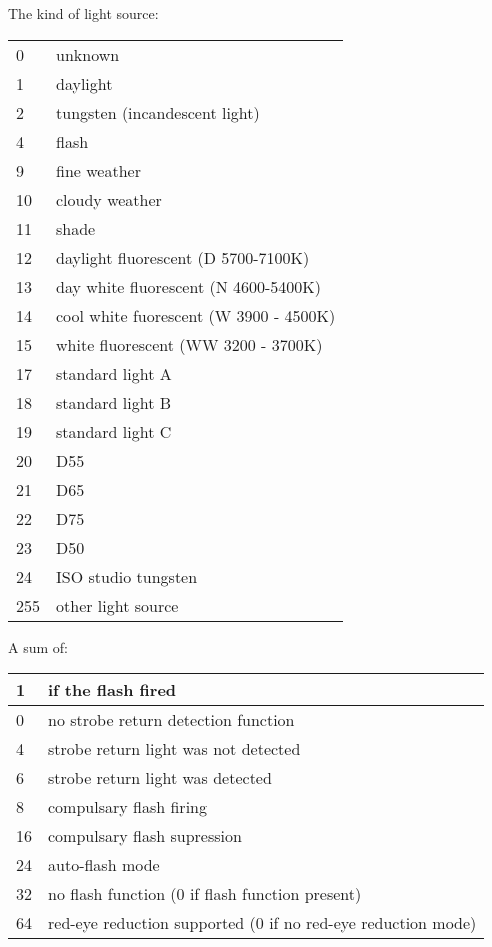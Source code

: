 The kind of light source:

\medskip

\begin{tabular}{p{0.3in} p{4in}}
0 & unknown \\
1 & daylight \\
2 & tungsten (incandescent light) \\
4 & flash \\
9 & fine weather \\
10 & cloudy weather \\
11 & shade \\
12 & daylight fluorescent (D 5700-7100K) \\
13 & day white fluorescent (N 4600-5400K) \\
14 & cool white fuorescent (W 3900 - 4500K) \\
15 & white fluorescent (WW 3200 - 3700K) \\
17 & standard light A \\
18 & standard light B \\
19 & standard light C \\
20 & D55 \\
21 & D65 \\
22 & D75 \\
23 & D50 \\
24 & ISO studio tungsten \\
255 & other light source
\end{tabular}
\apiend

A sum of:
\smallskip

\begin{tabular}{p{0.3in} p{4in}}
1 & if the flash fired \\
\hline
0 & no strobe return detection function \\
4 & strobe return light was not detected \\
6 & strobe return light was detected \\
\hline
8 & compulsary flash firing \\
16 & compulsary flash supression \\
24 & auto-flash mode \\
\hline 
32 & no flash function (0 if flash function present) \\
\hline
64 & red-eye reduction supported (0 if no red-eye reduction mode) 
\end{tabular}

\apiend

